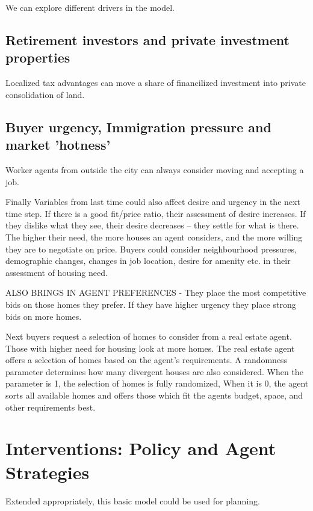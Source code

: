 We can explore different drivers in the model.

\subsection{Retirement investors and private investment properties}
Localized tax advantages can move a share of financilized investment into private consolidation of land.

\subsection{Buyer urgency, Immigration pressure and market 'hotness'} 
Worker agents from outside the city can always consider moving and accepting a job. %

Finally Variables from last time could also affect desire and urgency in the next time step. If there is a good fit/price ratio, their assessment of desire increases. If they dislike what they see, their desire decreases -- they settle for what is there. 
The higher their need, the more houses an agent considers, and the more willing they are to negotiate on price. %
Buyers could consider neighbourhood pressures, demographic changes, changes in job location, desire for amenity etc. in their assessment of housing need. 

ALSO BRINGS IN AGENT PREFERENCES - They place the most competitive bids on those homes they prefer. If they have higher urgency they place strong bids on more homes. 

Next buyers request a selection of homes to consider from a real estate agent. Those with higher need for housing look at more homes. The real estate agent offers a selection of homes based on the agent's requirements. A randomness parameter determines how many divergent houses are also considered. When the parameter is 1, the selection of homes is fully randomized, When it is 0, the agent sorts all available homes and offers those which fit the agents budget, space, and other requirements best.

\section{Interventions: Policy and Agent Strategies}
Extended appropriately, this basic model could be used for planning.

